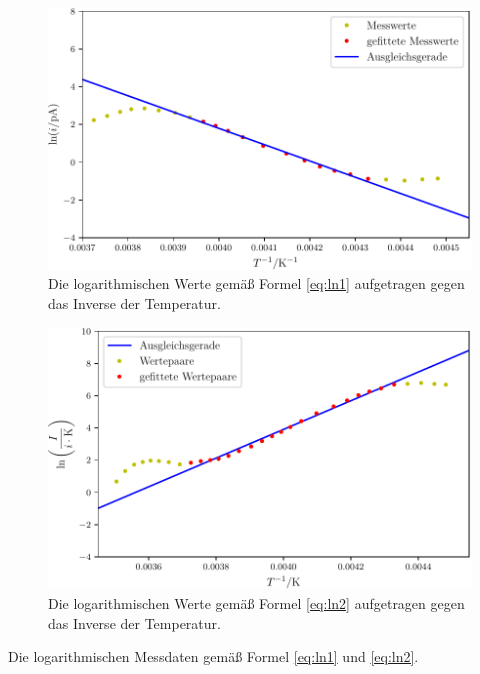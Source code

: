 \begin{figure}
	\centering
	\includegraphics[width=\linewidth-60pt,height=\textheight-60pt,keepaspectratio]{content/images/W1_1.pdf}
	\caption{Die logarithmischen Werte gemäß Formel \eqref{eq:ln1} aufgetragen gegen das Inverse der Temperatur.}
	\label{fig:W1_1}
\end{figure}

\begin{figure}
	\centering
	\includegraphics[width=\linewidth-60pt,height=\textheight-60pt,keepaspectratio]{content/images/W1_2.pdf}
	\caption{Die logarithmischen Werte gemäß Formel \eqref{eq:ln2} aufgetragen gegen das Inverse der Temperatur.}
	\label{fig:W1_2}
\end{figure}

\begin{table}
\caption{Die logarithmischen Messdaten gemäß Formel \eqref{eq:ln1} und \eqref{eq:ln2}.}
\begin{minipage}[t]{0.5\textwidth}
	\centering
	
	\label{tab:dataW1_1}
\end{minipage}
\begin{minipage}[t]{0.5\textwidth}
	\centering
	
	\label{tab:dataW1_2}
\end{minipage}
\end{table}


